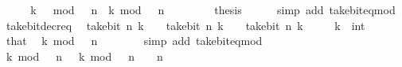 \begin{isabellebody}
\ \ \isamarkupfalse%
\ \isamarkupfalse%
\ {\isacartoucheopen}{\isacharparenleft}{\kern0pt}k\ {\isacharplus}{\kern0pt}\ {}{\isacharparenright}{\kern0pt}\ mod\ {}\ {\isacharcircum}{\kern0pt}\ n\ {\isacharequal}{\kern0pt}\ k\ mod\ {}\ {\isacharcircum}{\kern0pt}\ n\ {\isacharplus}{\kern0pt}\ {}{\isacartoucheclose}\ \isacommand{{\isachardot}{\kern0pt}}\isamarkupfalse%
\isanewline
\ \ \isamarkupfalse%
\ \isamarkupfalse%
\ {\isacharquery}{\kern0pt}thesis\isanewline
\ \ \ \ \isamarkupfalse%
\ {\isacharparenleft}{\kern0pt}simp\ add{\isacharcolon}{\kern0pt}\ take{\isacharunderscore}{\kern0pt}bit{\isacharunderscore}{\kern0pt}eq{\isacharunderscore}{\kern0pt}mod{\isacharparenright}{\kern0pt}\isanewline
{}\isamarkupfalse%
%
\endisatagproof
{\isafoldproof}%
%
\isadelimproof
\isanewline
%
\endisadelimproof
\isanewline
{}\isamarkupfalse%
\ take{\isacharunderscore}{\kern0pt}bit{\isacharunderscore}{\kern0pt}decr{\isacharunderscore}{\kern0pt}eq{\isacharcolon}{\kern0pt}\isanewline
\ \ {\isacartoucheopen}take{\isacharunderscore}{\kern0pt}bit\ n\ {\isacharparenleft}{\kern0pt}k\ {\isacharminus}{\kern0pt}\ {}{\isacharparenright}{\kern0pt}\ {\isacharequal}{\kern0pt}\ take{\isacharunderscore}{\kern0pt}bit\ n\ k\ {\isacharminus}{\kern0pt}\ {}{\isacartoucheclose}\ \ {\isacartoucheopen}take{\isacharunderscore}{\kern0pt}bit\ n\ k\ {\isasymnoteq}\ {}{\isacartoucheclose}\isanewline
\ \ \ k\ {\isacharcolon}{\kern0pt}{\isacharcolon}{\kern0pt}\ int\isanewline
%
\isadelimproof
%
\endisadelimproof
%
\isatagproof
{}\isamarkupfalse%
\ {\isacharminus}{\kern0pt}\isanewline
\ \ \isamarkupfalse%
\ that\ \isamarkupfalse%
\ {\isacartoucheopen}k\ mod\ {}\ {\isacharcircum}{\kern0pt}\ n\ {\isasymnoteq}\ {}{\isacartoucheclose}\isanewline
\ \ \ \ \isamarkupfalse%
\ {\isacharparenleft}{\kern0pt}simp\ add{\isacharcolon}{\kern0pt}\ take{\isacharunderscore}{\kern0pt}bit{\isacharunderscore}{\kern0pt}eq{\isacharunderscore}{\kern0pt}mod{\isacharparenright}{\kern0pt}\isanewline
\ \ \isamarkupfalse%
\ \isamarkupfalse%
\ {\isacartoucheopen}k\ mod\ {}\ {\isacharcircum}{\kern0pt}\ n\ {\isasymge}\ {}{\isacartoucheclose}\ {\isacartoucheopen}k\ mod\ {}\ {\isacharcircum}{\kern0pt}\ n\ {\isacharless}{\kern0pt}\ {}\ {\isacharcircum}{\kern0pt}\ n{\isacartoucheclose}\isanewline

\end{isabellebody}
